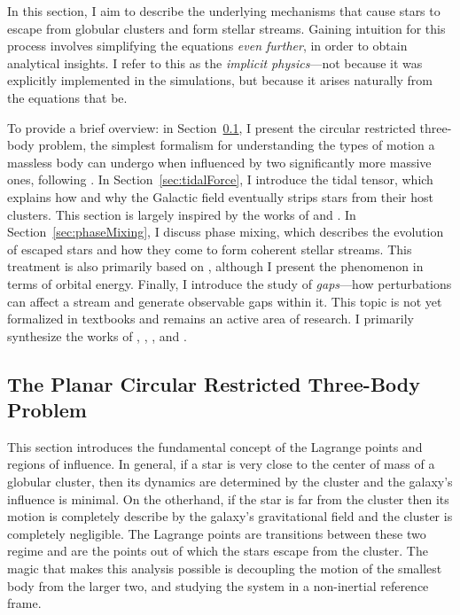     In this section, I aim to describe the underlying mechanisms that cause stars to escape from globular clusters and form stellar streams. Gaining intuition for this process involves simplifying the equations \textit{even further}, in order to obtain analytical insights. I refer to this as the \textit{implicit physics}—not because it was explicitly implemented in the simulations, but because it arises naturally from the equations that be.

    To provide a brief overview: in Section~\ref{sec:thePlanarCircularRestrictedThreeBodyProblem}, I present the circular restricted three-body problem, the simplest formalism for understanding the types of motion a massless body can undergo when influenced by two significantly more massive ones, following \citet{koon2000dynamical}. In Section~\ref{sec:tidalForce}, I introduce the tidal tensor, which explains how and why the Galactic field eventually strips stars from their host clusters. This section is largely inspired by the works of \citet{2004AJ....127.2753D} and \citet{bovy_inprep}. In Section~\ref{sec:phaseMixing}, I discuss phase mixing, which describes the evolution of escaped stars and how they come to form coherent stellar streams. This treatment is also primarily based on \citet[see chatper 19.4 of][]{bovy_inprep}, although I present the phenomenon in terms of orbital energy. Finally, I introduce the study of \textit{gaps}—how perturbations can affect a stream and generate observable gaps within it. This topic is not yet formalized in textbooks and remains an active area of research. I primarily synthesize the works of \citet{2012ApJ...748...20C,2013ApJ...775...90C}, \citet{2015MNRAS.450.1136E}, \citet{2016PhRvL.116l1301B}, and \citet{2016MNRAS.457.3817S}.
    \subsection{The Planar Circular Restricted Three-Body Problem}\label{sec:thePlanarCircularRestrictedThreeBodyProblem}
        
        This section introduces the fundamental concept of the Lagrange points and regions of influence. In general, if a star is very close to the center of mass of a globular cluster, then its dynamics are determined by the cluster and the galaxy's influence is minimal. On the otherhand, if the star is far from the cluster then its motion is completely describe by the galaxy's gravitational field and the cluster is completely negligible. The Lagrange points are transitions between these two regime and are the points out of which the stars escape from the cluster. The magic that makes this analysis possible is decoupling the motion of the smallest body from the larger two, and studying the system in a non-inertial reference frame. 

